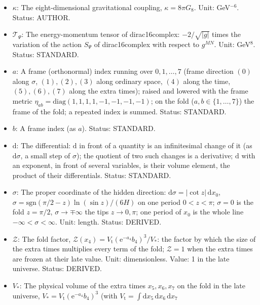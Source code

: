 \documentclass[
  10pt,
]{article}
\providecommand{\tightlist}{%
  \setlength{\itemsep}{0pt}\setlength{\parskip}{0pt}}
\begin{document}
\begin{itemize}
\tightlist
\item
  \(\kappa\): The eight-dimensional gravitational coupling,
  \(\kappa = 8\pi G_8\). Unit: GeV\(^{-6}\). Status: AUTHOR.
\item
  \(\mathcal{T}_\Psi\): The energy-momentum tensor of dirac16complex:
  \(-2/\sqrt{\lvert g\rvert}\) times the variation of the action
  \(S_\Psi\) of dirac16complex with respect to \(g^{MN}\). Unit:
  GeV\(^8\). Status: STANDARD.
\item
  \(a\): A frame (orthonormal) index running over \(0, 1, \dots, 7\)
  (frame direction \((0)\) along \(\sigma\), \((1), (2), (3)\) along
  ordinary space, \((4)\) along the time, \((5), (6), (7)\) along the
  extra times); raised and lowered with the frame metric
  \(\eta_{ab} = \mathrm{diag}(1, 1, 1, 1, -1, -1, -1, -1)\); on the fold
  (\(a, b \in \{1, \dots, 7\}\)) the frame of the fold; a repeated index
  is summed. Status: STANDARD.
\item
  \(b\): A frame index (as \(a\)). Status: STANDARD.
\item
  \(\mathrm{d}\): The differential: \(\mathrm{d}\) in front of a
  quantity is an infinitesimal change of it (as \(\mathrm{d}\sigma\), a
  small step of \(\sigma\)); the quotient of two such changes is a
  derivative; \(\mathrm{d}\) with an exponent, in front of several
  variables, is their volume element, the product of their
  differentials. Status: STANDARD.
\item
  \(\sigma\): The proper coordinate of the hidden direction:
  \(\mathrm{d}\sigma = \lvert\cot z\rvert\,\mathrm{d}x_0\),
  \(\sigma = \mathrm{sgn}(\pi/2 - z)\ln(\sin z)/(6H)\) on one period
  \(0 < z < \pi\); \(\sigma = 0\) is the fold \(z = \pi/2\),
  \(\sigma \to \mp\infty\) the tips \(z \to 0, \pi\); one period of
  \(x_0\) is the whole line \(-\infty < \sigma < \infty\). Unit: length.
  Status: DERIVED.
\item
  \(\mathcal{Z}\): The fold factor,
  \(\mathcal{Z}(x_4) = V_{\mathrm{t}}(\mathrm{e}^{-a_4}b_4)^3/V_*\): the
  factor by which the size of the extra times multiplies every term of
  the fold; \(\mathcal{Z} = 1\) when the extra times are frozen at their
  late value. Unit: dimensionless. Value: 1 in the late universe.
  Status: DERIVED.
\item
  \(V_*\): The physical volume of the extra times \(x_5, x_6, x_7\) on
  the fold in the late universe,
  \(V_* = V_{\mathrm{t}}(\mathrm{e}^{-a_4}b_4)^3\) (with
  \(V_{\mathrm{t}} = \int\mathrm{d}x_5\,\mathrm{d}x_6\,\mathrm{d}x_7\)

\end{itemize}
\end{document}
